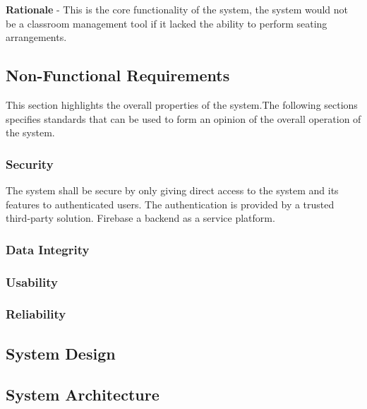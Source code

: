 \textbf{Rationale} - This is the core functionality of the system, the system would not be a classroom management tool if it lacked the ability to perform seating arrangements.

\subsection{Non-Functional Requirements}
This section highlights the overall properties of the system.The following sections specifies standards that can be used to form an opinion of the overall operation of the system.

\subsubsection{Security}
The system shall be secure by only giving direct access to the system and its features to authenticated users. The authentication is provided by a trusted third-party solution. Firebase \cite{website:Firebase} a backend as a service platform.

\subsubsection{Data Integrity}

\subsubsection{Usability}

\subsubsection{Reliability}

\subsection{System Design}

\subsection{System Architecture}